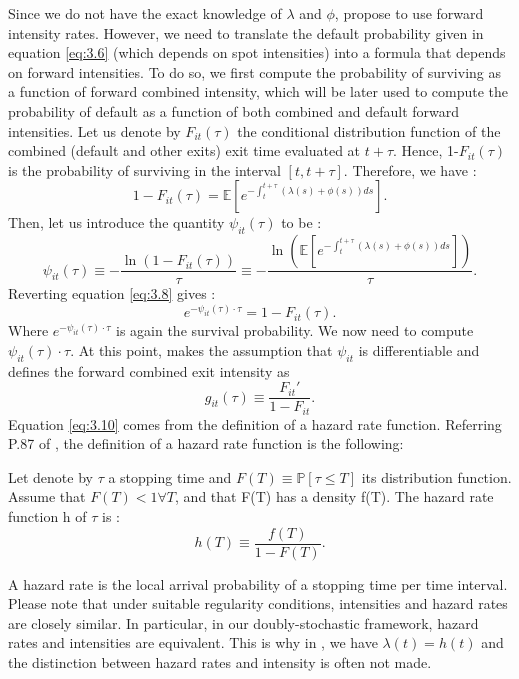 Since we do not have the exact knowledge of $\lambda$ and $\phi$, \citet{Duan2012} propose to use forward intensity rates. However, we need to translate the default probability given in equation \ref{eq:3.6} (which depends on spot intensities) into a formula that depends on forward intensities. To do so, we first compute the probability of surviving as a function of forward combined intensity, which will be later used to compute the probability of default as a function of both combined and default forward intensities. Let us denote by $F_{it}(\tau)$ the conditional distribution function of the combined (default and other exits) exit time evaluated at $t+\tau$. Hence, 1-$F_{it}(\tau)$ is the probability of surviving in the interval $[t, t+\tau ]$. Therefore, we have :
\begin{equation}
1-F_{it}(\tau) = \mathbb{E}[e^{-\int_t^{t+\tau} (\lambda(s)+\phi(s)) ds}].
\end{equation}
Then, let us introduce the quantity $\psi_{it}(\tau)$ to be :
\begin{equation} \label{eq:3.8}
\psi_{it}(\tau) \equiv -\frac{\ln(1-F_{it}(\tau))}{\tau} \equiv -\frac{\ln(\mathbb{E}[e^{-\int_t^{t+\tau} (\lambda(s)+\phi(s)) ds}])}{\tau}.
\end{equation}
Reverting equation \ref{eq:3.8} gives :
\begin{equation}\label{eq:psi}
e^{-\psi_{it}(\tau)\cdot\tau} = 1-F_{it}(\tau).
\end{equation}
Where $e^{-\psi_{it}(\tau)\cdot\tau}$ is again the survival probability. We now need to compute $\psi_{it}(\tau)\cdot\tau$. At this point, \citet{Duan2012} makes the assumption that $\psi_{it}$ is differentiable and defines the forward combined exit intensity as 
\begin{equation} \label{eq:3.10}
g_{it}(\tau) \equiv \frac{F_{it}'}{1-F_{it}}.
\end{equation}
Equation \ref{eq:3.10} comes from the definition of a hazard rate function. Referring  P.87 of \citet{book}, the definition of a hazard rate function is the following:
\begin{definition}
Let denote by $\tau$ a stopping time and $F(T) \equiv \mathbb{P}[\tau \leq T]$ its distribution function. Assume that $F(T) < 1 \forall T$, and that F(T) has a density f(T). The hazard rate function h of $\tau$ is :
\begin{equation*}
h(T) \equiv \frac{f(T)}{1-F(T)}.
\end{equation*}
\end{definition}
A hazard rate is the local arrival probability of a stopping time per time interval. Please note that under suitable regularity conditions, intensities and hazard rates are closely similar. In particular, in our doubly-stochastic framework, hazard rates and intensities are equivalent. This is why in \citet{Duan2012}, we have $\lambda(t) = h(t)$ and the distinction between hazard rates and intensity is often not made. \\

